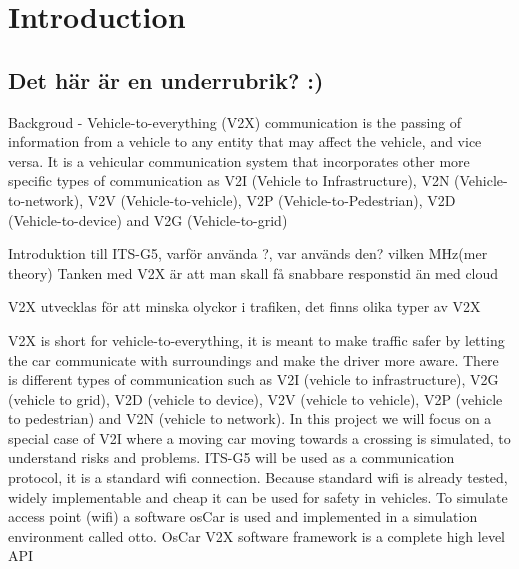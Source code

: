 \section{Introduction}
\subsection{Det här är en underrubrik? :)}
Backgroud - Vehicle-to-everything (V2X) communication is the passing of information from
a vehicle to any entity that may affect the vehicle, and vice versa. It is a vehicular
communication system that incorporates other more specific types of communication as 
V2I (Vehicle to Infrastructure), V2N (Vehicle-to-network), V2V (Vehicle-to-vehicle), V2P (Vehicle-to-Pedestrian), V2D (Vehicle-to-device) and V2G (Vehicle-to-grid) 

Introduktion till ITS-G5, varför använda ?, var används den? vilken MHz(mer theory)
Tanken med V2X är att man skall få snabbare responstid än med cloud 

V2X utvecklas för att minska olyckor i trafiken, det finns olika typer av V2X\bigskip



V2X is short for vehicle-to-everything, it is meant to make traffic safer by letting the car communicate with surroundings and make the driver more aware. There is different types of communication such as V2I (vehicle to infrastructure), V2G (vehicle to grid), V2D (vehicle to device), V2V (vehicle to vehicle), V2P (vehicle to pedestrian) and V2N (vehicle to network). In this project we will focus on a special case of V2I where a moving car moving towards a crossing is simulated, to understand risks and problems. ITS-G5 will be used as a communication protocol, it is a standard wifi connection. Because standard wifi is already tested, widely implementable and cheap it can be used for safety in vehicles. To simulate access point (wifi) a software osCar is used and implemented in a simulation environment called otto. OsCar V2X software framework is a complete high level API 
